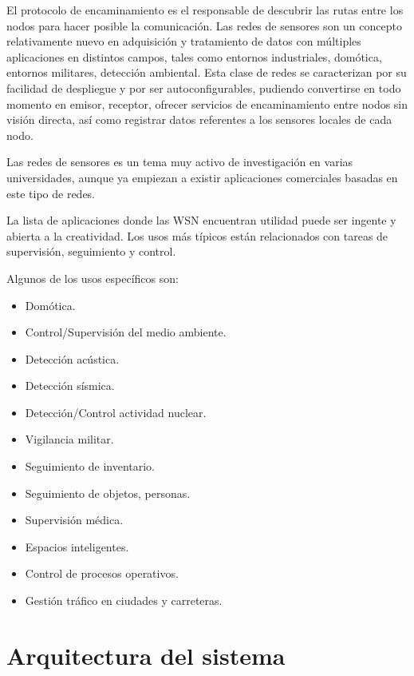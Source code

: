 El protocolo de encaminamiento es el responsable de descubrir las rutas entre los nodos para hacer posible la
comunicaci\'on. Las redes de sensores son un concepto relativamente nuevo en adquisici\'on y tratamiento de datos con
m\'ultiples aplicaciones en distintos campos, tales como entornos industriales, dom\'otica, entornos militares, detecci\'on
ambiental. Esta clase de redes se caracterizan por su facilidad de despliegue y por ser autoconfigurables, pudiendo
convertirse en todo momento en emisor, receptor, ofrecer servicios de encaminamiento entre nodos sin visi\'on directa,
as\'i como registrar datos referentes a los sensores locales de cada nodo.


Las redes de sensores es un tema muy activo de investigaci\'on en varias universidades, aunque ya empiezan a existir
aplicaciones comerciales basadas en este tipo de redes. 


La lista de aplicaciones donde las WSN encuentran utilidad puede ser ingente y abierta a la creatividad. Los usos m\'as
t\'ipicos est\'an relacionados con tareas de supervisi\'on, seguimiento y control. 



Algunos de los usos espec\'ificos son:

\begin{itemize}
\item Dom\'otica.
\item Control/Supervisi\'on del medio ambiente.
\item Detecci\'on ac\'ustica.
\item Detecci\'on s\'ismica.
\item Detecci\'on/Control actividad nuclear.
\item Vigilancia militar.
\item Seguimiento de inventario.
\item Seguimiento de objetos, personas.
\item Supervisi\'on m\'edica.
\item Espacios inteligentes.
\item Control de procesos operativos.
\item Gesti\'on tr\'afico en ciudades y carreteras.
\end{itemize}

 

\section{Arquitectura del sistema}

